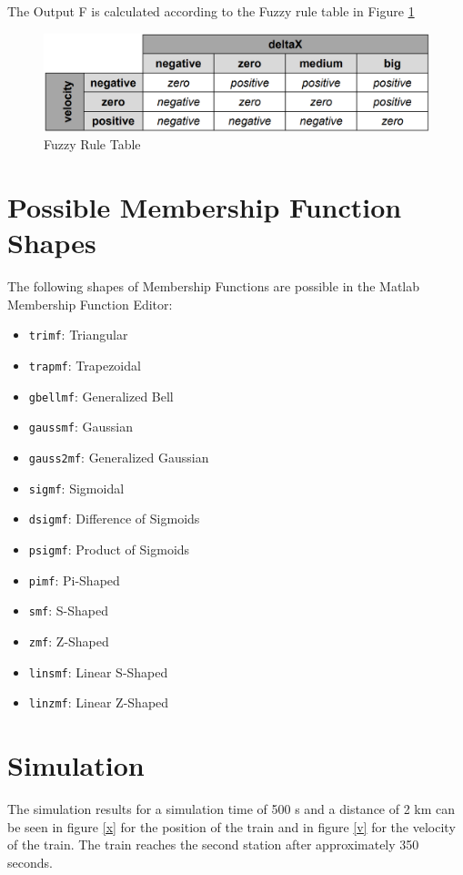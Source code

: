 The Output F is calculated according to the Fuzzy rule table in Figure \ref{rules}


\begin{figure}[h]
	\centering
	\includegraphics[width=0.9\linewidth]{images/rule_table.png}
	\caption{Fuzzy Rule Table}
	\label{rules}
\end{figure}


\section{Possible Membership Function Shapes}

The following shapes of Membership Functions are possible in the Matlab Membership Function Editor:

\begin{itemize}
	\item \texttt{trimf}: Triangular
	\item \texttt{trapmf}: Trapezoidal
	\item \texttt{gbellmf}: Generalized Bell
	\item \texttt{gaussmf}: Gaussian
	\item \texttt{gauss2mf}: Generalized Gaussian
	\item \texttt{sigmf}: Sigmoidal
	\item \texttt{dsigmf}: Difference of Sigmoids
	\item \texttt{psigmf}: Product of Sigmoids
	\item \texttt{pimf}: Pi-Shaped
	\item \texttt{smf}: S-Shaped
	\item \texttt{zmf}: Z-Shaped
	\item \texttt{linsmf}: Linear S-Shaped
	\item \texttt{linzmf}: Linear Z-Shaped
\end{itemize}



\section{Simulation}

The simulation results for a simulation time of 500 s and a distance of 2 km can be seen in figure \ref{x} for the position of the train and in figure \ref{v} for the velocity of the train. The train reaches the second station after approximately 350 seconds.

